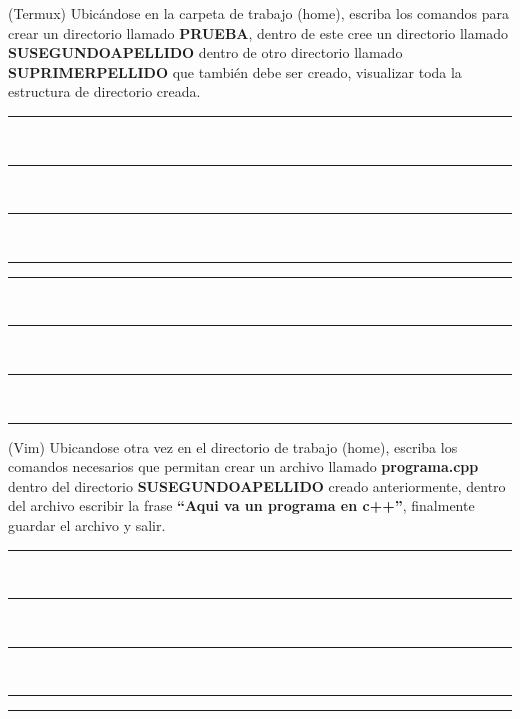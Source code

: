 \documentclass[12pt]{exam}
\begin{document}
\begin{questions}
\question[20] (Termux) Ubicándose en la carpeta de trabajo (home), escriba los comandos  para crear un directorio
llamado \textbf{PRUEBA}, dentro de este cree un directorio llamado  \textbf{SUSEGUNDOAPELLIDO} dentro de otro directorio llamado 
\textbf{SUPRIMERPELLIDO} que también debe ser creado, visualizar toda la estructura de directorio creada.\\


\begin{minipage}[H]{0.40\linewidth}
  \noindent \rule{7cm}{0.4pt} \\
  
  \noindent \rule{7cm}{0.4pt} \\
  
  \noindent \rule{7cm}{0.4pt} \\
  
  \noindent \rule{7cm}{0.4pt} 
  
\end{minipage} \hspace{2cm} 
\begin{minipage}[H]{0.40\linewidth}
    \noindent \rule{7cm}{0.4pt} \\
  
    \noindent \rule{7cm}{0.4pt} \\
  
    \noindent \rule{7cm}{0.4pt} \\
  
    \noindent \rule{7cm}{0.4pt} 
  
\end{minipage}

\question[20] (Vim) Ubicandose otra vez en el directorio de trabajo (home), escriba los comandos necesarios que permitan crear un archivo
llamado \textbf{programa.cpp} dentro del directorio
\textbf{SUSEGUNDOAPELLIDO} creado anteriormente, dentro del
archivo escribir la frase \textbf{``Aqui va un programa en c++''}, finalmente guardar el archivo y salir.\\

\begin{minipage}[H]{0.40\linewidth}
  \noindent \rule{7cm}{0.4pt} \\
  
  \noindent \rule{7cm}{0.4pt} \\
  
  \noindent \rule{7cm}{0.4pt} \\
  
  \noindent \rule{7cm}{0.4pt}
\end{minipage} \hspace{2cm} 
\begin{minipage}[H]{0.40\linewidth}
    \noindent \rule{7cm}{0.4pt} \\
  


\end{minipage}
\end{questions}
\end{document}
